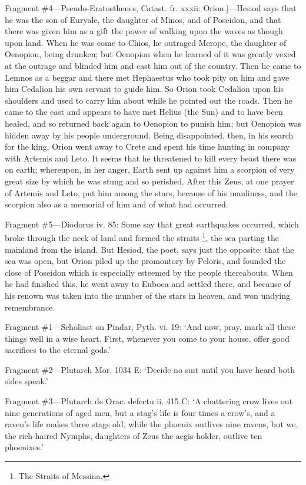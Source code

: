Fragment \#4—Pseudo-Eratosthenes, Catast. fr. xxxii: Orion.]—Hesiod
says that he was the son of Euryale, the daughter of Minos, and of Poseidon,
and that there was given him as a gift the power of walking upon the waves as
though upon land. When he was come to Chios, he outraged Merope, the daughter
of Oenopion, being drunken; but Oenopion when he learned of it was greatly
vexed at the outrage and blinded him and cast him out of the country. Then he
came to Lemnos as a beggar and there met Hephaestus who took pity on him and
gave him Cedalion his own servant to guide him. So Orion took Cedalion upon his
shoulders and used to carry him about while he pointed out the roads. Then he
came to the east and appears to have met Helius (the Sun) and to have been
healed, and so returned back again to Oenopion to punish him; but Oenopion was
hidden away by his people underground. Being disappointed, then, in his search
for the king, Orion went away to Crete and spent his time hunting in company
with Artemis and Leto. It seems that he threatened to kill every beast there
was on earth; whereupon, in her anger, Earth sent up against him a scorpion of
very great size by which he was stung and so perished. After this Zeus, at one
prayer of Artemis and Leto, put him among the stars, because of his manliness,
and the scorpion also as a memorial of him and of what had occurred.

Fragment \#5—Diodorus iv. 85: Some say that great earthquakes occurred,
which broke through the neck of land and formed the straits \footnote{The Straits of Messina.}, the sea parting the mainland
from the island. But Hesiod, the poet, says just the opposite: that the sea was
open, but Orion piled up the promontory by Peloris, and founded the close of
Poseidon which is especially esteemed by the people thereabouts. When he had
finished this, he went away to Euboea and settled there, and because of his
renown was taken into the number of the stars in heaven, and won undying
remembrance.


Fragment \#1—Scholiast on Pindar, Pyth. vi. 19: ‘And now, pray, mark
all these things well in a wise heart. First, whenever you come to your house,
offer good sacrifices to the eternal gods.’

Fragment \#2—Plutarch Mor. 1034 E: ‘Decide no suit until you have
heard both sides speak.’

Fragment \#3—Plutarch de Orac. defectu ii. 415 C: ‘A chattering crow
lives out nine generations of aged men, but a stag’s life is four times a
crow’s, and a raven’s life makes three stags old, while the phoenix
outlives nine ravens, but we, the rich-haired Nymphs, daughters of Zeus the
aegis-holder, outlive ten phoenixes.’

